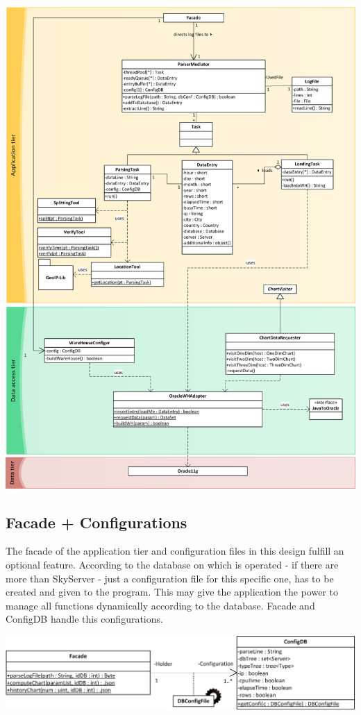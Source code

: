 \begin{center}
\includegraphics[width=0.9\linewidth]{Pictures/AppTierDia2.png}
\end{center}  

\subsection{Facade + Configurations}
The facade of the application tier and configuration files in this design fulfill an
optional feature. According to the database on which is operated - if there are more
than SkyServer - just a configuration file for this specific one, has to be created and
given to the program. This may give the application the power to manage all functions dynamically
according to the database. Facade and ConfigDB handle this configurations.


\begin{center}
\includegraphics{Pictures/Parts/FacadeConfi.png}
\end{center}   

